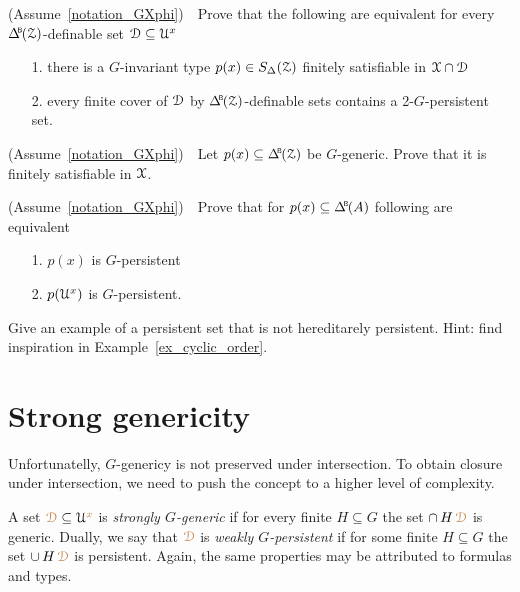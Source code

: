 \begin{exercise}
  (Assume~\ref{notation_GXphi})\ \  
  Prove that the following are equivalent for every $\BDelta({\Z})$-definable set $\EuScript D\subseteq\EuScript U^x$
  \begin{itemize}
    \item[1.] there is a $G$-invariant type $p(x)\in S_\Delta(\EuScript Z)$ finitely satisfiable in $\EuScript X\cap\EuScript D$
    \item[2.] every finite cover of $\EuScript D$ by $\BDelta({\Z})$-definable sets contains a 2-$G$-persistent set.
  \end{itemize}
\end{exercise}

\begin{exercise}\label{ex_gen_sat}
  (Assume~\ref{notation_GXphi})\ \  
  Let $p(x)\subseteq \BDelta(\Z)$ be $G$-generic.
  Prove that it is finitely satisfiable in $\EuScript X$.
\end{exercise}

\begin{exercise}\label{ex_persistent_types}
  (Assume~\ref{notation_GXphi})\ \  
  Prove that for $p(x)\subseteq \BDelta(A)$ following are equivalent
  \begin{itemize}
    \item[1.] $p(x)$ is $G$-persistent
    \item[2.] $p(\EuScript U^x)$ is $G$-persistent.
  \end{itemize}
\end{exercise}

\begin{exercise}
  Give an example of a persistent set that is not hereditarely persistent.
  Hint: find inspiration in Example~\ref{ex_cyclic_order}.
\end{exercise}

\section{Strong genericity}\label{strong_genericity}\label{strong_genericity}

Unfortunatelly, $G$-genericy is not preserved under intersection.
To obtain closure under intersection, we need to push the concept to a higher level of complexity.

A set ${\color{brown}\EuScript D}\subseteq\EuScript U^{\color{brown} x}$ is \emph{strongly $G$-generic\/} if for every finite $H\subseteq G$ the set $\cap\,H\,{\color{brown}\EuScript D}$ is generic.
Dually, we say that ${\color{brown}\EuScript D}$ is \emph{weakly $G$-persistent\/} if for some finite $H\subseteq G$ the set $\cup\,H\,{\color{brown}\EuScript D}$ is persistent.
Again, the same properties may be attributed to formulas and types.

